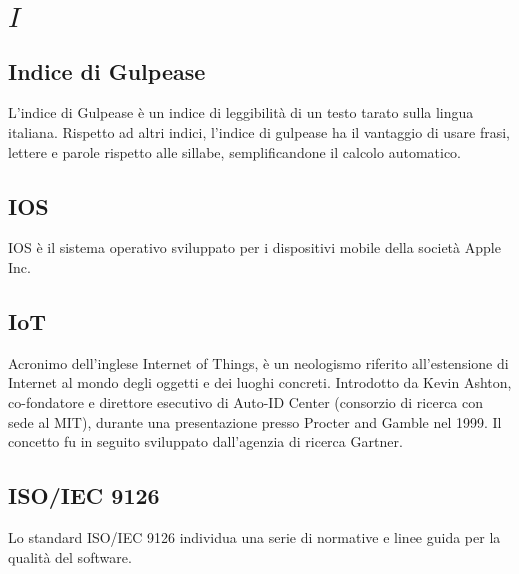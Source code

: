 \section{\quad$I\quad$}
\subsection{Indice di Gulpease}
L'indice di Gulpease è un indice di leggibilità di un testo tarato sulla lingua italiana. Rispetto ad altri indici, l'indice di gulpease ha il vantaggio di usare frasi, lettere e parole rispetto alle sillabe, semplificandone il calcolo automatico.

\subsection{IOS}
IOS è il sistema operativo sviluppato per i dispositivi mobile della società Apple Inc. 

\subsection{IoT}
Acronimo dell'inglese Internet of Things, è un neologismo riferito all’estensione di Internet al mondo degli oggetti e dei luoghi concreti. Introdotto da Kevin Ashton, co-fondatore e direttore esecutivo di Auto-ID Center (consorzio di ricerca con sede al MIT), durante una presentazione presso Procter and Gamble nel 1999. Il concetto fu in seguito sviluppato dall’agenzia di ricerca Gartner.

\subsection{ISO/IEC 9126}
Lo standard ISO/IEC 9126 individua una serie di normative e linee guida per la qualità del software.

